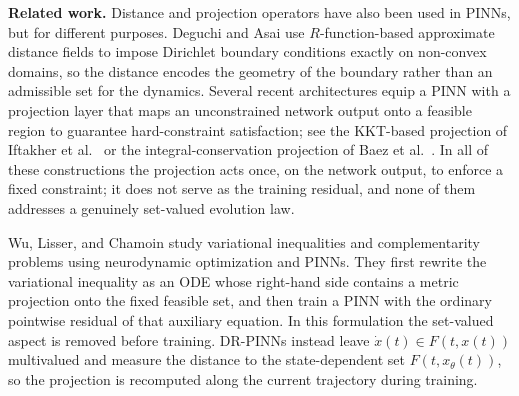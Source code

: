 \documentclass[11pt]{elsarticle}
\theoremstyle{definition}
\theoremstyle{remark}
\numberwithin{equation}{section}
\begin{document}
	\vspace{0.3cm}
	
	\noindent\textbf{Related work.} 
	Distance and projection operators have also been used in PINNs, but for
	different purposes.  Deguchi and Asai \cite{deguchi2025} use
	$R$-function-based approximate distance fields to impose Dirichlet
	boundary conditions exactly on non-convex domains, so the distance
	encodes the geometry of the boundary rather than an admissible set for
	the dynamics.  Several recent architectures equip a PINN with a
	projection layer that maps an unconstrained network output onto a
	feasible region to guarantee hard-constraint satisfaction; see the
	KKT-based projection of Iftakher et al.\ \cite{iftakher2025} or the
	integral-conservation projection of Baez et al.\ \cite{baez2025}.  In
	all of these constructions the projection acts once, on the network
	output, to enforce a fixed constraint; it does not serve as the training
	residual, and none of them addresses a genuinely set-valued evolution law.
	
	Wu, Lisser, and Chamoin
	\cite{wu2024cmame,wu2023,wu2024neuropinn,wu2025errorbound} study
	variational inequalities and complementarity problems using neurodynamic
	optimization and PINNs. They first rewrite the variational inequality as
	an ODE whose right-hand side contains a metric projection onto the fixed
	feasible set, and then train a PINN with the ordinary pointwise residual
	of that auxiliary equation. In this formulation the set-valued aspect is
	removed before training. DR-PINNs instead leave
	$\dot{x}(t)\in F(t,x(t))$ multivalued and measure the distance to the
	state-dependent set $F(t,x_\theta(t))$, so the projection is recomputed
	along the current trajectory during training.
	
\end{document}
